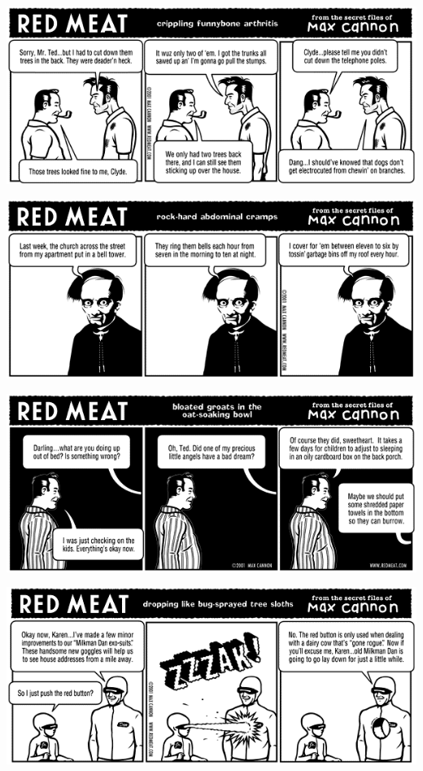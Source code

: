 \documentclass[a4paper,twoside,11pt]{article}
\begin{document}
\includegraphics[width=\textwidth]{redmeat_2001-04-17.png}



\includegraphics[width=\textwidth]{redmeat_2001-04-24.png}



\includegraphics[width=\textwidth]{redmeat_2001-05-01.png}



\includegraphics[width=\textwidth]{redmeat_2001-05-08.png}
\end{document}
